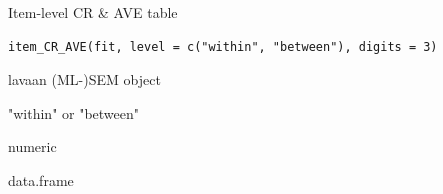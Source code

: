 \documentclass[a4paper]{book}
\begin{document}
%
\begin{Description}
Item-level CR \& AVE table
\end{Description}
%
\begin{Usage}
\begin{verbatim}
item_CR_AVE(fit, level = c("within", "between"), digits = 3)
\end{verbatim}
\end{Usage}
%
\begin{Arguments}
\begin{ldescription}
\item[\code{fit}] lavaan (ML-)SEM object

\item[\code{level}] "within" or "between"

\item[\code{digits}] numeric
\end{ldescription}
\end{Arguments}
%
\begin{Value}
data.frame
\end{Value}
\end{document}
